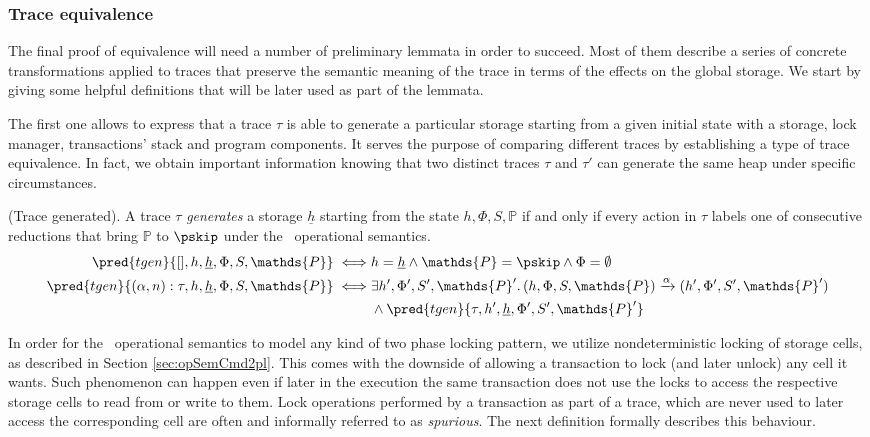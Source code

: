 \subsubsection{Trace equivalence}

The final proof of equivalence will need a number of preliminary lemmata in order to succeed. Most of them describe a series of concrete transformations applied to traces that preserve the semantic meaning of the trace in terms of the effects on the global storage. We start by giving some helpful definitions that will be later used as part of the lemmata.

The first one allows to express that a trace $\tau$ is able to generate a particular storage starting from a given initial state with a storage, lock manager, transactions' stack and program components. It serves the purpose of comparing different traces by establishing a type of trace equivalence. In fact, we obtain important information knowing that two distinct traces $\tau$ and $\tau'$ can generate the same heap under specific circumstances.

\begin{defn}
	(Trace generated).
	A trace $\tau$ \emph{generates} a storage $\underline{h}$ starting from the state $h, \Phi, S, \mathds{P}$ if and only if every action in $\tau$ labels one of consecutive reductions that bring $\mathds{P}$ to $\pskip$ under the \tpl\ operational semantics.
	\begin{align*}
		\pred{tgen}{[], h, \underline{h}, \Phi, S, \mathds{P}}
			\iff&
		h = \underline{h} \land \mathds{P} = \pskip \land \Phi = \emptyset
			\\
		\pred{tgen}{(\alpha, n) : \tau, h, \underline{h}, \Phi, S, \mathds{P}}
			\iff&
		\exists h', \Phi', S', \mathds{P}' \ldotp (h, \Phi, S, \mathds{P}) \xrightarrow{\alpha} (h', \Phi', S', \mathds{P}') \\ &\land \pred{tgen}{\tau, h', \underline{h}, \Phi', S', \mathds{P}'}
	\end{align*}
\end{defn}

In order for the \tpl\ operational semantics to model any kind of two phase locking pattern, we utilize nondeterministic locking of storage cells, as described in Section \ref{sec:opSemCmd2pl}. This comes with the downside of allowing a transaction to lock (and later unlock) any cell it wants. Such phenomenon can happen even if later in the execution the same transaction does not use the locks to access the respective storage cells to read from or write to them. Lock operations performed by a transaction as part of a trace, which are never used to later access the corresponding cell are often and informally referred to as \textit{spurious}. The next definition formally describes this behaviour.

